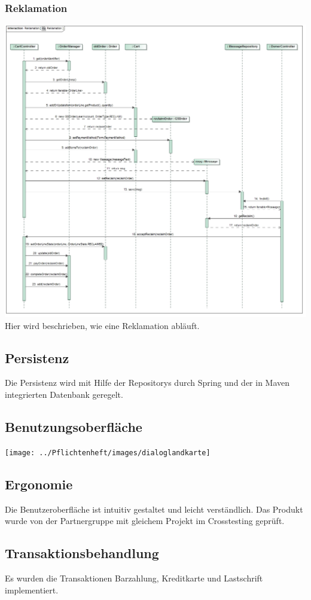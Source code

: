 \documentclass[pdftex,12pt,a4paper]{article}
\begin{document}
\subsubsection*{Reklamation}
\includegraphics[width=1\textwidth]{../../Entwurf/reklamation_ood}
Hier wird beschrieben, wie eine Reklamation abl\"auft.


\subsection{Persistenz}
Die Persistenz wird mit Hilfe der Repositorys durch Spring und der in Maven integrierten Datenbank geregelt.

\subsection{Benutzungsoberfläche}
\texttt{[image: ../Pflichtenheft/images/dialoglandkarte]}

\subsection{Ergonomie}
Die Benutzeroberfl\"ache ist intuitiv gestaltet und leicht verst\"andlich.
Das Produkt wurde von der Partnergruppe mit gleichem Projekt im Crosstesting gepr\"uft.
\subsection{Transaktionsbehandlung}
Es wurden die Transaktionen Barzahlung, Kreditkarte und Lastschrift implementiert.
\end{document}
